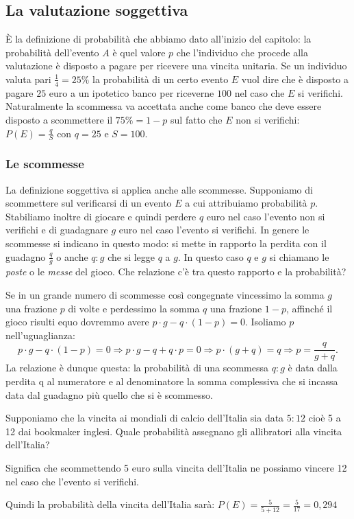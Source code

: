 \subsection{La valutazione soggettiva}
È la definizione di probabilità che abbiamo dato all'inizio del capitolo: la 
probabilità dell'evento $A$ è quel valore $p$ che l'individuo che procede alla 
valutazione è disposto a pagare per ricevere una vincita unitaria. Se un 
individuo valuta pari $\frac 1 4=25\%$ la probabilità di un certo evento $E$ 
vuol dire che è disposto a pagare $25$ euro a un ipotetico banco per riceverne 
$100$ nel caso che $E$ si verifichi. Naturalmente la scommessa va accettata 
anche come banco che deve essere disposto a scommettere il $75\%=1-p$ sul fatto 
che $E$ non si verifichi: $P(E)=\frac q S$ con $ q=25 $ e $S=100$.
\subsubsection*{Le scommesse}
La definizione soggettiva si applica anche alle scommesse. Supponiamo di 
scommettere sul verificarsi di un evento $E$ a cui attribuiamo probabilità $p$. 
Stabiliamo inoltre di giocare e quindi perdere $q$ euro nel caso l'evento non 
si 
verifichi e di guadagnare $g$ euro nel caso l'evento si verifichi. In genere le 
scommesse si indicano in questo modo: si mette in rapporto la perdita con il 
guadagno $\frac q g$ o anche $q:g$ che si legge $q$ a $g$. In questo caso $q$ e 
$g$ si chiamano le \emph{poste} o le \emph{messe} del gioco.
Che relazione c'è tra questo rapporto e la probabilità?

Se in un grande numero di scommesse così congegnate vincessimo la somma $g$ una 
frazione $p$ di volte e perdessimo la somma $q$ una frazione $1-p$, affinché il 
gioco risulti equo dovremmo avere $p\cdot g-q\cdot (1-p)=0$. Isoliamo $p$ 
nell'uguaglianza:
\begin{equation*}
p\cdot g-q\cdot (1-p)=0 \Rightarrow p\cdot g-q+q\cdot p=0\Rightarrow p\cdot 
(g+q)=q \Rightarrow p=\frac q{g+q}.
\end{equation*}
La relazione è dunque questa: la probabilità di una scommessa $q:g$ è data 
dalla 
perdita q al numeratore e al denominatore la somma complessiva che si incassa 
data dal guadagno più quello che si è scommesso.


\begin{esempio}
Supponiamo che la vincita ai mondiali di calcio dell'Italia sia data $5:12$ 
cioè 
5 a 12 dai bookmaker inglesi. Quale probabilità assegnano gli allibratori alla 
vincita dell'Italia?

Significa che scommettendo 5 euro sulla vincita dell'Italia ne possiamo vincere 
12 nel caso che l'evento si verifichi.

Quindi la probabilità della vincita dell'Italia sarà:
$P(E)=\frac 5{5+12}=\frac 5{17}=0,294$
\end{esempio}

